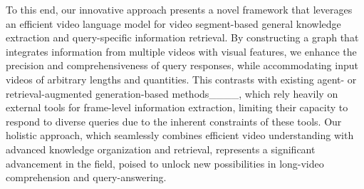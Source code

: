 To this end, our innovative approach presents a novel framework that leverages an efficient video language model for video segment-based general knowledge extraction and query-specific information retrieval. By constructing a graph that integrates information from multiple videos with visual features, we enhance the precision and comprehensiveness of query responses, while accommodating input videos of arbitrary lengths and quantities. This contrasts with existing agent- or retrieval-augmented generation-based methods____, which rely heavily on external tools for frame-level information extraction, limiting their capacity to respond to diverse queries due to the inherent constraints of these tools. Our holistic approach, which seamlessly combines efficient video understanding with advanced knowledge organization and retrieval, represents a significant advancement in the field, poised to unlock new possibilities in long-video comprehension and query-answering.